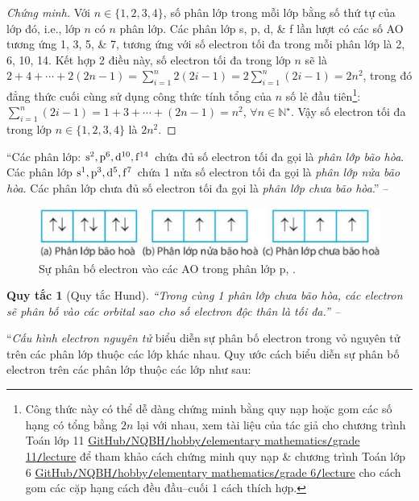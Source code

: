 \documentclass[oneside]{book}
\numberwithin{equation}{section}
\newtheorem{quytac}{Quy tắc}[section]
\begin{document}
\begin{proof}[Chứng minh]
	Với $n\in\{1,2,3,4\}$, số phân lớp trong mỗi lớp bằng số thứ tự của lớp đó, i.e., lớp $n$ có $n$ phân lớp. Các phân lớp s, p, d, \& f lần lượt có các số AO tương ứng 1, 3, 5, \& 7, tương ứng với số electron tối đa trong mỗi phân lớp là 2, 6, 10, 14. Kết hợp 2 điều này, số electron tối đa trong lớp $n$ sẽ là $2 + 4 + \cdots + 2(2n - 1) = \sum_{i=1}^n 2(2i - 1) = 2\sum_{i=1}^n (2i - 1) = 2n^2$, trong đó đẳng thức cuối cùng sử dụng công thức tính tổng của $n$ số lẻ đầu tiên\footnote{Công thức này có thể dễ dàng chứng minh bằng quy nạp hoặc gom các số hạng có tổng bằng $2n$ lại với nhau, xem tài liệu của tác giả cho chương trình Toán lớp 11 \href{https://github.com/NQBH/hobby/blob/master/elementary_mathematics/grade_11/NQBH_elementary_mathematics_grade_11.pdf}{GitHub\texttt{/}NQBH\texttt{/}hobby\texttt{/}elementary mathematics\texttt{/}grade 11\texttt{/}lecture} để tham khảo cách chứng minh quy nạp \& chương trình Toán lớp 6 \href{https://github.com/NQBH/hobby/blob/master/elementary_mathematics/grade_6/NQBH_elementary_mathematics_grade_6.pdf}{GitHub\texttt{/}NQBH\texttt{/}hobby\texttt{/}elementary mathematics\texttt{/}grade 6\texttt{/}lecture} cho cách gom các cặp hạng cách đều đầu--cuối 1 cách thích hợp.}: $\sum_{i=1}^n (2i - 1) = 1 + 3 + \cdots + (2n - 1) = n^2$, $\forall n\in\mathbb{N}^\star$. Vậy số electron tối đa trong lớp $n\in\{1,2,3,4\}$ là $2n^2$.
\end{proof}
``Các phân lớp: $\rm s^2,p^6,d^{10},f^{14}$ chứa đủ số electron tối đa gọi là \textit{phân lớp bão hòa}. Các phân lớp $\rm s^1,p^3,d^5,f^7$ chứa 1 nửa số electron tối đa gọi là \textit{phân lớp nửa bão hòa}. Các phân lớp chưa đủ số electron tối đa gọi là \textit{phân lớp chưa bão hòa}.'' -- \cite[p. 31]{SGK_Hoa_Hoc_10_Chan_Troi_Sang_Tao}

\begin{figure}[H]
	\centering
	\includegraphics[scale=0.15]{su_phan_bo_electron_vao_cac_AO_trong_phan_lop_p}
	\caption{Sự phân bố electron vào các AO trong phân lớp p, \cite[Hình 4.10, p. 31]{SGK_Hoa_Hoc_10_Chan_Troi_Sang_Tao}.}
\end{figure}

\begin{quytac}[Quy tắc Hund]
	``Trong cùng 1 phân lớp chưa bão hòa, các electron sẽ phân bố vào các orbital sao cho số electron độc thân là tối đa.'' -- \cite[p. 31]{SGK_Hoa_Hoc_10_Chan_Troi_Sang_Tao}
\end{quytac}
``\textit{Cấu hình electron nguyên tử} biểu diễn sự phân bố electron trong vỏ nguyên tử trên các phân lớp thuộc các lớp khác nhau. Quy ước cách biểu diễn sự phân bố electron trên các phân lớp  thuộc các lớp như sau:
\end{document}
